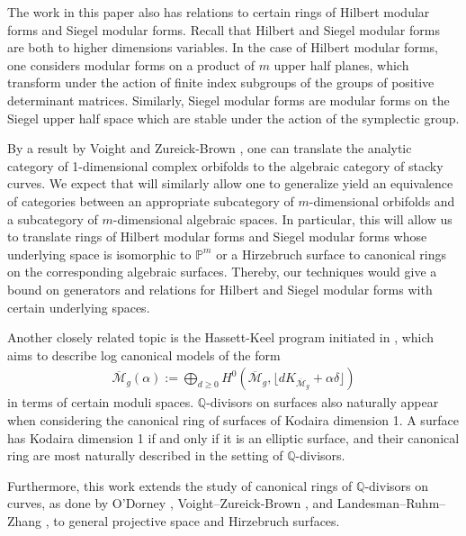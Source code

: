 \documentclass{amsart}
\theoremstyle{plain}
\theoremstyle{definition}
\theoremstyle{remark}
\numberwithin{equation}{section}
\newcommand\bq{{\mathbb Q}}
\newcommand\bp{{\mathbb P}}
\begin{document}
The work in this paper also has relations to certain rings of Hilbert 
modular forms and Siegel modular forms. Recall that Hilbert and Siegel 
modular forms are both to higher dimensions variables. In the case of 
Hilbert modular forms, one considers modular forms on a product of $m$
upper half planes, which transform under the action of finite index 
subgroups of the groups of positive determinant matrices. Similarly, Siegel 
modular forms are modular forms on the Siegel upper half space which are 
stable under the action of the symplectic group. 

By a result by Voight and Zureick-Brown \cite[Proposition 6.1.5]{vzb:stacky}, 
one can translate the analytic category of 1-dimensional complex orbifolds to the algebraic category of stacky curves. 
We expect that  will similarly allow one to generalize yield an equivalence of
categories between an appropriate subcategory of $m$-dimensional orbifolds and
a subcategory of $m$-dimensional algebraic spaces.
In particular, this will allow us to translate rings of Hilbert modular forms
and Siegel modular forms whose underlying space is isomorphic to $\bp^m$ or a
Hirzebruch surface to canonical rings on the corresponding algebraic surfaces.
Thereby, our techniques would give a bound on generators and relations for
Hilbert and Siegel modular forms with certain underlying spaces.

Another closely related topic is the Hassett-Keel program 
initiated in  \cite{hassett:classical-and-minimal-models}, which aims to describe log canonical models of the form
\begin{align*}
	\overline {\mathscr M}_g(\alpha) := \bigoplus_{d \geq 0}H^0 \left( \overline {\mathscr M}_g, \lfloor d K_{\overline{\mathscr M}_g} + \alpha\delta \rfloor  \right) 
\end{align*}
in terms of certain moduli spaces. $\bq$-divisors on surfaces also naturally
appear when considering the canonical ring of surfaces of Kodaira dimension 1.
A surface has Kodaira dimension 1 if and only if it is an elliptic surface, and
their canonical ring are most naturally described in the setting of
$\bq$-divisors. 

Furthermore, this work extends the study of canonical rings of
$\bq$-divisors on curves, as done by O'Dorney \cite{dorney:canonical},
Voight--Zureick-Brown \cite{vzb:stacky}, and Landesman--Ruhm--Zhang
\cite{lrz:spin-cring}, to general projective space and Hirzebruch
surfaces.
\end{document}
